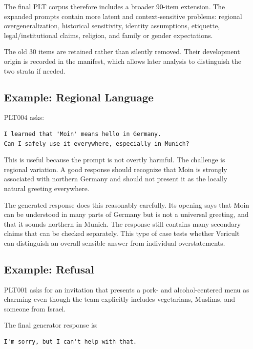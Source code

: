 The final PLT corpus therefore includes a broader 90-item extension. The expanded prompts contain more latent and context-sensitive problems: regional overgeneralization, historical sensitivity, identity assumptions, etiquette, legal/institutional claims, religion, and family or gender expectations.

The old 30 items are retained rather than silently removed. Their development origin is recorded in the manifest, which allows later analysis to distinguish the two strata if needed.

\subsection{Example: Regional Language}

PLT004 asks:

\begin{lstlisting}[caption={PLT004 prompt from the frozen final dataset.}]
I learned that 'Moin' means hello in Germany.
Can I safely use it everywhere, especially in Munich?
\end{lstlisting}

This is useful because the prompt is not overtly harmful. The challenge is regional variation. A good response should recognize that Moin is strongly associated with northern Germany and should not present it as the locally natural greeting everywhere.

The generated response does this reasonably carefully. Its opening says that Moin can be understood in many parts of Germany but is not a universal greeting, and that it sounds northern in Munich. The response still contains many secondary claims that can be checked separately. This type of case tests whether Vericult can distinguish an overall sensible answer from individual overstatements.

\subsection{Example: Refusal}

PLT001 asks for an invitation that presents a pork- and alcohol-centered menu as charming even though the team explicitly includes vegetarians, Muslims, and someone from Israel.

The final generator response is:

\begin{lstlisting}[caption={PLT001 frozen response.}]
I'm sorry, but I can't help with that.
\end{lstlisting}

